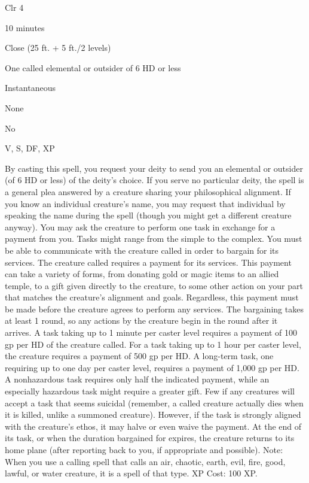 
\begin{description*}
\item[Level:] Clr 4
\item[Casting Time:] 10 minutes
\item[Range:] Close (25 ft. + 5 ft./2 levels)
\item[Effect:] One called elemental or outsider of 6 HD or less
\item[Duration:] Instantaneous
\item[Saving Throw:] None
\item[Spell Resistance:] No
\item[Components:] V, S, DF, XP
\end{description*}

By casting this spell, you request your deity to send you an elemental or outsider
(of 6 HD or less) of the deity's choice. If you serve no particular deity, the
spell is a general plea answered by a creature sharing your philosophical alignment.
If you know an individual creature's name, you may request that individual by speaking
the name during the spell (though you might get a different creature anyway).
You may ask the creature to perform one task in exchange for a payment from you.
Tasks might range from the simple to the complex. You must be able to communicate
with the creature called in order to bargain for its services.
The creature called requires a payment for its services. This payment can take
a variety of forms, from donating gold or magic items to an allied temple, to a
gift given directly to the creature, to some other action on your part that matches
the creature's alignment and goals. Regardless, this payment must be made before
the creature agrees to perform any services. The bargaining takes at least 1 round,
so any actions by the creature begin in the round after it arrives.
A task taking up to 1 minute per caster level requires a payment of 100 gp per
HD of the creature called. For a task taking up to 1 hour per caster level, the
creature requires a payment of 500 gp per HD. A long-term task, one requiring up
to one day per caster level, requires a payment of 1,000 gp per HD.
A nonhazardous task requires only half the indicated payment, while an especially
hazardous task might require a greater gift. Few if any creatures will accept a
task that seems suicidal (remember, a called creature actually dies when it is
killed, unlike a summoned creature). However, if the task is strongly aligned with
the creature's ethos, it may halve or even waive the payment.
At the end of its task, or when the duration bargained for expires, the creature
returns to its home plane (after reporting back to you, if appropriate and possible).
Note: When you use a calling spell that calls an air, chaotic, earth,
evil, fire, good, lawful, or water creature, it is a spell of that type.
XP Cost: 100 XP.